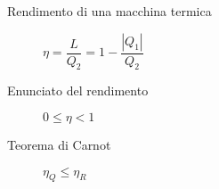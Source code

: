 \documentclass[a4paper,11pt,italian]{article}
\begin{document}
\begin{description}
%   
%   
%    

  \item[Rendimento di una macchina termica]
  $ \eta = \dfrac{L}{Q_2} = 1 - \dfrac{|Q_1|}{Q_2} $
  
  \item[Enunciato del rendimento] 
  $ 0 \leq \eta < 1 $
  
%   
  \item[Teorema di Carnot] 
  $ \eta_Q \leq \eta_R $
  


\end{description}
\end{document}
